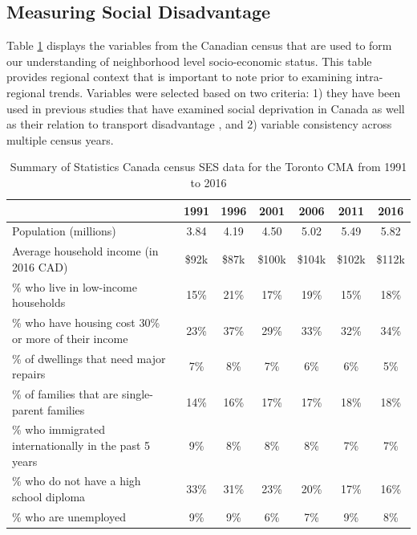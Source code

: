 \subsection{Measuring Social Disadvantage}

Table \ref{table:census} displays the variables from the Canadian census that are used to form our understanding of neighborhood level socio-economic status. This table provides regional context that is important to note prior to examining intra-regional trends. Variables were selected based on two criteria: 1) they have been used in previous studies that have examined social deprivation in Canada  as well as their relation to transport disadvantage , and 2) variable consistency across multiple census years.

\begin{table}[h]
	\small
	
	\caption{{Summary of Statistics Canada census SES data for the Toronto CMA from 1991 to 2016}}
	\label{table:census}
	\begin{adjustwidth}{-1in}{-1in}
		\centering
	\begin{tabular}{lcccccc}
		\hline
		\textbf{}                          & \textbf{1991} & \textbf{1996} & \textbf{2001} & \textbf{2006} & \textbf{2011} & \textbf{2016} \\
		\hline
		Population (millions)                      & 3.84   & 4.19   & 4.50   & 5.02   & 5.49   & 5.82   \\
		Average household income (in 2016 CAD) & \$92k   & \$87k   & \$100k   & \$104k   & \$102k   & \$112k \\
		\% who live in low-income households                 & 15\% & 21\% & 17\% & 19\% & 15\% & 18\% \\
		\% who have housing cost 30\% or more of their income & 23\% & 37\% & 29\% & 33\% & 32\% & 34\% \\
		\% of dwellings that need major repairs            & 7\%  & 8\%  & 7\%  & 6\%  & 6\%  & 5\%  \\
		
		\% of families that are single-parent families               & 
		14\% & 16\% & 17\% & 17\% & 18\% & 18\% \\
		\% who immigrated internationally in the past 5 years              & 9\%  & 8\%  & 8\%  & 8\%  & 7\%  & 7\%  \\
		\% who do not have a high school diploma    & 33\% & 31\% & 23\% & 20\% & 17\% & 16\% \\
		\% who are unemployed                              & 9\%  & 9\%  & 6\%  & 7\%  & 9\%  & 8\%  \\
		\hline 
	\end{tabular}
\end{adjustwidth}
\end{table}

